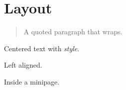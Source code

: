 
\section{Layout}
\begin{quote}
A quoted paragraph
that wraps.
\end{quote}
\begin{center}
Centered text with \textit{style}.
\end{center}
\begin{flushleft}
Left aligned.
\end{flushleft}
\begin{minipage}{0.4\textwidth}
Inside a minipage.
\end{minipage}

